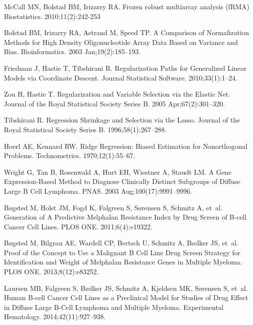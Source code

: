 \documentclass[10pt,letterpaper]{article}
\begin{document}
\begin{thebibliography}{10}
McCall MN, Bolstad BM, Irizarry RA.
\newblock Frozen robust multiarray analysis (fRMA)
\newblock Biostatistics. 2010;11(2):242-253

Bolstad BM, Irizarry RA, Astrand M, Speed TP.
\newblock A Comparison of Normalization Methods for High Density
  Oligonucleotide Array Data Based on Variance and Bias.
\newblock Bioinformatics. 2003 Jan;19(2):185--193.

Friedman J, Hastie T, Tibshirani R.
\newblock Regularization Paths for Generalized Linear Models via Coordinate
  Descent.
\newblock Journal Statistical Software. 2010;33(1):1--24.

Zou H, Hastie T.
\newblock Regularization and Variable Selection via the Elastic Net.
\newblock Journal of the Royal Statistical Society Series B. 2005
  Apr;67(2):301--320.

Tibshirani R.
\newblock Regression Shrinkage and Selection via the Lasso.
\newblock Journal of the Royal Statistical Society Series B.
  1996;58(1):267--288.

Hoerl AE, Kennard RW.
\newblock Ridge Regression: Biased Estimation for Nonorthogonal Problems.
\newblock Technometrics. 1970;12(1):55--67.

Wright G, Tan B, Rosenwald A, Hurt EH, Wiestner A, Staudt LM.
\newblock A Gene Expression-Based Method to Diagnose Clinically Distinct
Subgroups of Diffuse Large {B} Cell Lymphoma.
\newblock PNAS. 2003 Aug;100(17):9991--9996.


B{\o}gsted M, Holst JM, Fogd K, Falgreen S, S{\o}rensen S, Schmitz A, et~al.
\newblock Generation of A Predictive Melphalan Resistance Index by Drug Screen
  of {B}-cell Cancer Cell Lines.
\newblock PLOS ONE. 2011;6(4):e19322.

B{\o}gsted M, Bilgrau AE, Wardell CP, Bertsch U, Schmitz A, B{\o}dker JS,
  et~al.
\newblock Proof of the Concept to Use a Malignant {B} Cell Line Drug Screen
  Strategy for Identification and Weight of Melphalan Resistance Genes in
  Multiple Myeloma.
\newblock PLOS ONE. 2013;8(12):e83252.

Laursen MB, Falgreen S, B{\o}dker JS, Schmitz A, Kjeldsen MK, S{\o}rensen S,
  et~al.
\newblock Human {B}-cell Cancer Cell Lines as a Preclinical Model for Studies
  of Drug Effect in Diffuse Large {B}-Cell Lymphoma and Multiple Myeloma.
\newblock Experimental Hematology. 2014;42(11):927--938.


\end{thebibliography}
\end{document}
